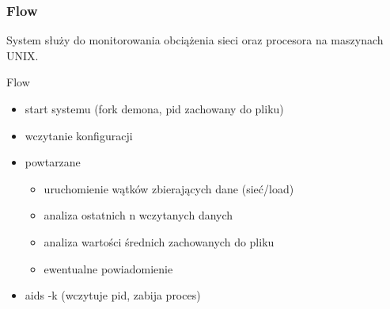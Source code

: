 \documentclass{beamer}
\begin{document}
\begin{frame}
\frametitle{Flow}
System służy do monitorowania obciążenia sieci oraz procesora na maszynach UNIX.

Flow
\begin{itemize}
\item start systemu (fork demona, pid zachowany do pliku)
\item wczytanie konfiguracji
\item powtarzane
\begin{itemize}
\item uruchomienie wątków zbierających dane (sieć/load)
\item analiza ostatnich n wczytanych danych
\item analiza wartości średnich zachowanych do pliku
\item ewentualne powiadomienie
\end{itemize}
\item aids -k (wczytuje pid, zabija proces)
\end{itemize}
\end{frame}
\end{document}
